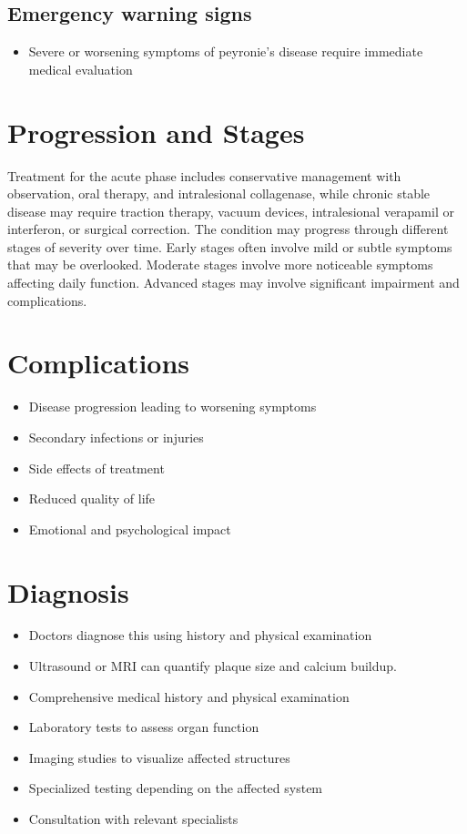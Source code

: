 \subsection{Emergency warning signs}
\begin{itemize}[noitemsep]
  \item Severe or worsening symptoms of peyronie's disease require immediate medical evaluation
\end{itemize}
\section{Progression and Stages}
Treatment for the acute phase includes conservative management with observation, oral therapy, and intralesional collagenase, while chronic stable disease may require traction therapy, vacuum devices, intralesional verapamil or interferon, or surgical correction. The condition may progress through different stages of severity over time. Early stages often involve mild or subtle symptoms that may be overlooked. Moderate stages involve more noticeable symptoms affecting daily function. Advanced stages may involve significant impairment and complications.
\section{Complications}
\begin{itemize}[noitemsep]
  \item Disease progression leading to worsening symptoms
  \item Secondary infections or injuries
  \item Side effects of treatment
  \item Reduced quality of life
  \item Emotional and psychological impact
\end{itemize}
\section{Diagnosis}
\begin{itemize}[noitemsep]
  \item Doctors diagnose this using history and physical examination
  \item Ultrasound or MRI can quantify plaque size and calcium buildup.
  \item Comprehensive medical history and physical examination
  \item Laboratory tests to assess organ function
  \item Imaging studies to visualize affected structures
  \item Specialized testing depending on the affected system
  \item Consultation with relevant specialists
\end{itemize}
